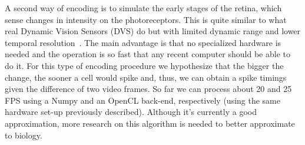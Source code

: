A second way of encoding is to simulate the early stages of the retina, which 
sense changes in intensity on the photoreceptors. This is quite similar to what 
real Dynamic Vision Sensors (DVS) do but with limited dynamic range and lower 
temporal resolution~\cite{aer-retina-bernabe,dvs-zurich}. The main advantage is 
that no specialized hardware is needed and the operation is so fast that any 
recent computer should be able to do it. For this type of encoding procedure we 
hypothesize that the bigger the change, the sooner a cell would spike and, 
thus, we can obtain a spike timings given the difference of two video frames. 
So far we can process about 20 and 25 FPS using a Numpy and an OpenCL back-end, 
respectively (using the same hardware set-up previously described). Although 
it's currently a good approximation, more research on this algorithm is needed 
to better approximate to biology. 

